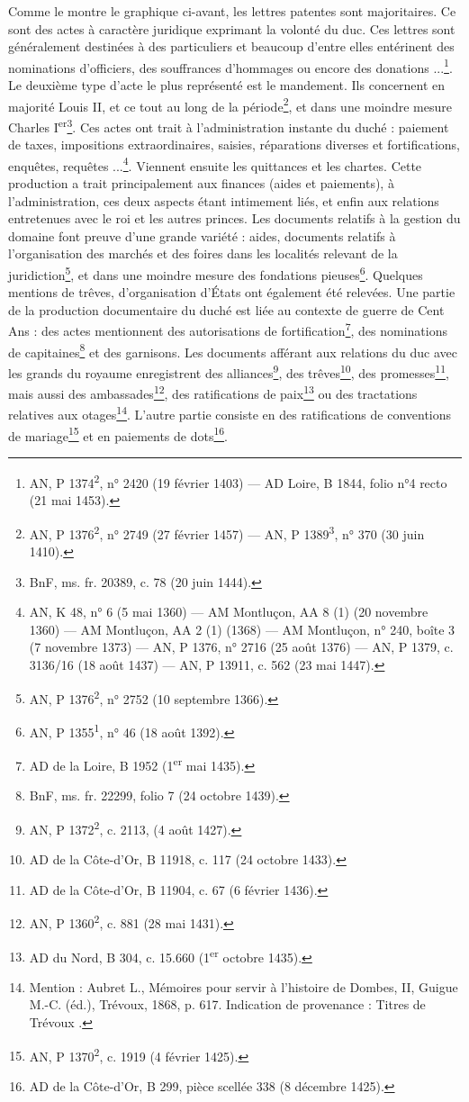 \par  Comme le montre le graphique ci-avant, les lettres patentes sont majoritaires. Ce sont des actes à caractère juridique exprimant la volonté du duc. Ces lettres sont généralement destinées à des particuliers et beaucoup d'entre elles entérinent des nominations d'officiers, des souffrances d'hommages ou encore des donations ...\footnote{AN, P 1374\textsuperscript{2}, n° 2420 (19 février 1403) — AD Loire, B 1844, folio n°4 recto (21 mai 1453).}. Le deuxième type d'acte le plus représenté est le mandement. Ils concernent en majorité Louis II, et ce tout au long de la période\footnote{AN, P 1376\textsuperscript{2}, n° 2749 (27 février 1457) — AN, P 1389\textsuperscript{3}, n° 370 (30 juin 1410).}, et dans une moindre mesure Charles I\textsuperscript{er}\footnote{BnF, ms. fr. 20389, c. 78 (20 juin 1444).}. Ces actes ont trait à l'administration instante du duché : paiement de taxes, impositions extraordinaires, saisies, réparations diverses et fortifications, enquêtes, requêtes ...\footnote{AN, K 48, n° 6 (5 mai 1360) — AM Montluçon, AA 8 (1) (20 novembre 1360) — AM Montluçon, AA 2 (1) (1368) — AM Montluçon, n° 240, boîte 3 (7 novembre 1373) — AN, P 1376, n° 2716 (25 août 1376) — AN, P 1379, c. 3136/16 (18 août 1437) — AN, P 13911, c. 562 (23 mai 1447).}. Viennent ensuite les quittances et les chartes. Cette production a trait principalement aux finances (aides et paiements), à l'administration, ces deux aspects étant intimement liés, et enfin aux relations entretenues avec le roi et les autres princes. Les documents relatifs à la gestion du domaine font preuve d’une grande variété : aides, documents relatifs à l’organisation des marchés et des foires dans les localités relevant de la juridiction\footnote{AN, P 1376\textsuperscript{2}, n° 2752 (10 septembre 1366).}, et dans une moindre mesure des fondations pieuses\footnote{AN, P 1355\textsuperscript{1}, n° 46 (18 août 1392).}. Quelques mentions de trêves, d’organisation d'États ont également été relevées. Une partie de la production documentaire du duché est liée au contexte de guerre de Cent Ans : des actes mentionnent des autorisations de fortification\footnote{AD de la Loire, B 1952 (1\textsuperscript{er} mai 1435).}, des nominations de capitaines\footnote{BnF, ms. fr. 22299, folio 7 (24 octobre 1439).} et des garnisons. Les documents afférant aux relations du duc avec les grands du royaume enregistrent des alliances\footnote{AN, P 1372\textsuperscript{2}, c. 2113, (4 août 1427).}, des trêves\footnote{AD de la Côte-d’Or, B 11918, c. 117 (24 octobre 1433).}, des promesses\footnote{AD de la Côte-d’Or, B 11904, c. 67 (6 février 1436).}, mais aussi des ambassades\footnote{AN, P 1360\textsuperscript{2}, c. 881 (28 mai 1431).}, des ratifications de paix\footnote{AD du Nord, B 304, c. 15.660 (1\textsuperscript{er} octobre 1435).} ou des tractations relatives aux otages\footnote{Mention : Aubret L., Mémoires pour servir à l’histoire de Dombes, II, Guigue M.-C. (éd.), Trévoux, 1868, p. 617. Indication de provenance : \og Titres de Trévoux \fg.}. L’autre partie consiste en des ratifications de conventions de mariage\footnote{AN, P 1370\textsuperscript{2}, c. 1919 (4 février 1425).} et en paiements de dots\footnote{AD de la Côte-d’Or, B 299, pièce scellée 338 (8 décembre 1425).}. 
\newpage 

